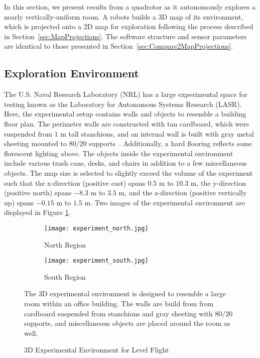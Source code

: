 In this section, we present results from a quadrotor as it autonomously explores a nearly vertically-uniform room. A robots builds a 3D map of its environment, which is projected onto a 2D map for exploration following the process described in Section~\ref{sec:MapProjections}. The software structure and sensor parameters are identical to those presented in Section~\ref{sec:Compare2MapProjections}.

\subsection{Exploration Environment}

The U.S. Naval Research Laboratory (NRL) has a large experimental space for testing known as the Laboratory for Autonomous Systems Research (LASR). Here, the experimental setup contains walls and objects to resemble a building floor plan. The perimeter walls are constructed with tan cardboard, which were suspended from $1$ m tall stanchions, and an internal wall is built with gray metal sheeting mounted to $80/20$ supports~\cite{url_8020}. Additionally, a hard flooring reflects some florescent lighting above. The objects inside the experimental environment include various trash cans, desks, and chairs in addition to a few miscellaneous objects. The map size is selected to slightly exceed the volume of the experiment such that the x-direction (positive east) spans $0.5$ m to $10.3$ m, the y-direction (positive north) spans $-8.3$ m to $3.5$ m, and the z-direction (positive vertically up) spans $-0.15$ m to $1.5$ m. Two images of the experimental environment are displayed in Figure \ref{fig:exp3DEnvironment}.

\begin{figure}[!t]
\centering
    	\begin{subfigure}[t]{0.95\columnwidth}
           	\centering
          	\texttt{[image: experiment\_north.jpg]}
        		\caption{North Region}
    	\end{subfigure}
    	\begin{subfigure}[t]{0.95\columnwidth}
	\vspace*{0.03\columnwidth}
           	\centering
          	\texttt{[image: experiment\_south.jpg]}
        		\caption{South Region}
    	\end{subfigure}
	\caption{3D Experimental Environment for Level Flight}
	\medskip
	\small
	The 3D experimental environment is designed to resemble a large room within an office building. The walls are build from from cardboard suspended from stanchions and gray sheeting with $80/20$ supports, and miscellaneous objects are placed around the room as well.
	\label{fig:exp3DEnvironment}
\end{figure}



